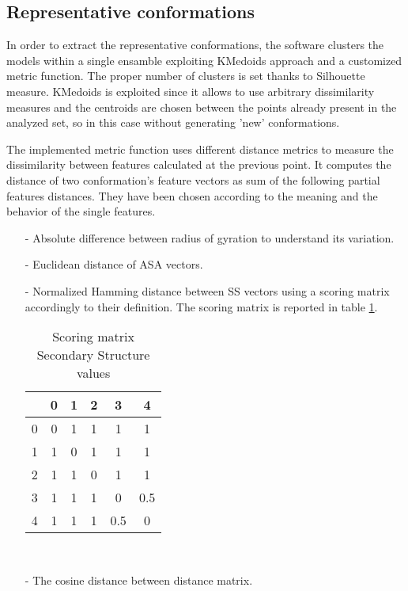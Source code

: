 \subsection{Representative conformations} 
In order to extract the representative conformations, the software clusters the models within a single ensamble exploiting KMedoids approach and a customized metric function. The proper number of clusters is set thanks to Silhouette measure. 
KMedoids is exploited since it allows to use arbitrary dissimilarity measures and the centroids are chosen between the points already present in the analyzed set, so in this case without generating 'new' conformations. 

\medskip
The implemented metric function uses different distance metrics to measure the dissimilarity between features calculated at the previous point. It computes the distance of two conformation's feature vectors as sum of the following partial features distances. They have been chosen according to the meaning and the behavior of the single features.
\begin{itemize}
\item[-] Absolute difference between radius of gyration to understand its variation.
\item[-] Euclidean distance of ASA vectors.
\item[-] Normalized Hamming distance between SS vectors using a scoring matrix accordingly to their definition. The scoring matrix is reported in table \ref{tab:score}. 

\begin{table}[H]
\begin{center}
\begin{tabular}{c|ccccc}
& 0 & 1 & 2 & 3 & 4 \\
\hline
0 & 0 & 1 & 1 & 1 & 1\\
1 & 1 & 0 & 1 & 1 & 1\\
2 & 1 & 1 & 0 & 1 & 1\\
3 & 1 & 1 & 1 & 0 & 0.5\\
4 & 1 & 1 & 1 & 0.5 & 0\\
\end{tabular}
\end{center}
\caption{Scoring matrix Secondary Structure values}~\label{tab:score}
\end{table}

\item[-] The cosine distance between distance matrix. 
\end{itemize}

